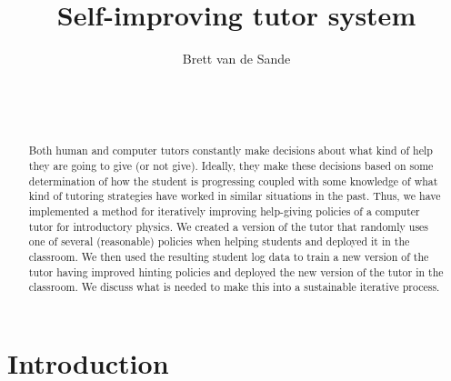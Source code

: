 \documentclass{edm_template}
\begin{document}
\title{Self-improving tutor system}
\author{
\alignauthor
      Brett van de Sande\\
       \\
       \\
       \\
}
\maketitle

%



\begin{abstract}
Both human and computer tutors constantly make decisions about
what kind of help they are going to give (or not give).  Ideally,
they make these decisions based on some determination of how
the student is progressing coupled with some knowledge of what kind
of tutoring strategies have worked in similar situations in the past.
Thus, we have implemented a method for iteratively improving 
help-giving policies of a computer tutor for introductory physics.  
We created a version of the tutor that randomly uses one of several 
(reasonable) policies when helping students and deployed it in the
classroom.  We then used the resulting student log data to 
train a new version of the tutor having improved hinting policies
and deployed the new version of the tutor in the classroom.  
We discuss what is needed to make this into a sustainable iterative process.
\end{abstract}


\section{Introduction}
\end{document}
